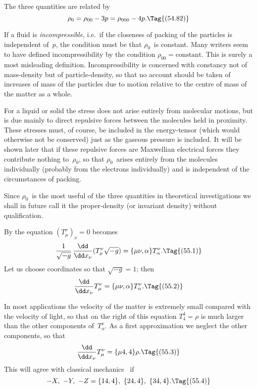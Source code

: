 \documentclass[12pt]{book}
\begin{document}
The three quantities are related by
\[
\rho_{0} = \rho_{00} - 3p = \rho_{000} - 4p.
\Tag{(54.82)}
\]

If a fluid is \emph{incompressible}, i.e.\ if the closeness of packing of the particles
is independent of~$p$, the condition must be that $\rho_{0}$~is constant\footnotemark.\footnotetext
  {Many writers seem to have defined incompressibility by the condition $\rho_{00} = \text{constant}$. This
%
  is surely a most misleading definition.}
Incompressibility
is concerned with constancy not of mass-density but of particle-density,
so that no account should be taken of increases of mass of the particles due
to motion relative to the centre of mass of the matter as a whole.

For a liquid or solid the stress does not arise entirely from molecular
motions, but is due mainly to direct repulsive forces between the molecules held
in proximity. These stresses must, of course, be included in the energy-tensor
(which would otherwise not be conserved) just as the gaseous pressure is
included. It will be shown later that if these repulsive forces are Maxwellian
electrical forces they contribute nothing to~$\rho_{0}$, so that $\rho_{0}$~arises entirely from
the molecules individually (probably from the electrons individually) and is
independent of the circumstances of packing.

Since $\rho_{0}$~is the most useful of the three quantities in theoretical investigations
we shall in future call it the proper-density (or invariant density)
without qualification.

%

By  the equation $(T_{\mu}^{\nu})_{\nu} = 0$ becomes
\[
\frac{1}{\sqrt{-g}}\, \frac{\dd}{\dd x_{\nu}}(T_{\mu}^{\nu} \sqrt{-g})
= \{\mu\nu, \alpha\} T_{\alpha}^{\nu}.
\Tag{(55.1)}
\]
Let us choose coordinates so that $\sqrt{-g} = 1$; then
\[
\frac{\dd}{\dd x_{\nu}}T_{\mu}^{\nu} = \{\mu\nu, \alpha\} T_{\alpha}^{\nu}.
\Tag{(55.2)}
\]

In most applications the velocity of the matter is extremely small compared
with the velocity of light, so that on the right of this equation $T_{4}^{4} = \rho$ is
much larger than the other components of~$T_{\alpha}^{\nu}$. As a first approximation we
neglect the other components, so that
\[
\frac{\dd}{\dd x_{\nu}} T_{\mu}^{\nu} = \{\mu4, 4\} \rho.
\Tag{(55.3)}
\]
This will agree with classical mechanics~ if
\[
-X,\ -Y,\ -Z = \{14, 4\},\ \{24, 4\},\ \{34, 4\}.
\Tag{(55.4)}
\]
\end{document}
